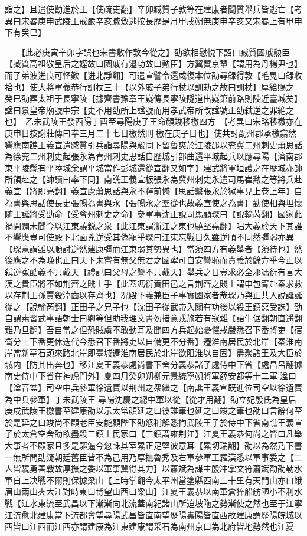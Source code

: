 詣之】且遣使勸進於王【使疏吏翻】辛卯臧質子敦等在建康者聞質舉兵皆逃亡【考異曰宋畧庚申武陵王戒嚴辛亥臧敷逃按長歷是月甲戌朔無庚申辛亥又宋畧上有甲申下有癸巳】

　　【此必庚寅辛卯字誤也宋書敷作敦今從之】劭欲相慰悦下詔曰臧質國戚勲臣【臧質高祖敬皇后之姪故曰國戚有邉功故曰勲臣】方翼贊京輦【謂用為丹楊尹也】而子弟波迸良可怪歎【迸北諍翻】可遣宣譬令還咸復本位劭尋録得敦【毛晃曰録收拾也】使大將軍義恭行訓杖三十【以外戚子弟行杖以訓勅之故曰訓杖】厚給賜之　癸巳劭葬太祖于長寧陵【據齊書豫章王嶷傳長寧陵隧道出嶷第前路則陵近臺城矣】諡曰景皇帝廟號中宗【史不用劭所上諡號而用孝武帝所改諡號正劭弑逆之罪絶之也】　乙未武陵王發西陽丁酉至尋陽庚子王命顔竣移檄四方　【考異曰宋略移檄亦在庚申日按謝莊傳曰奉三月二十七日檄然則檄在庚子日也】使共討劭州郡承檄翕然響應南譙王義宣遣臧質引兵詣尋陽與駿同下留魯爽於江陵邵以兖冀二州刺史蕭思話為徐兖二州刺史起張永為青州刺史思話自歷城引部曲還平城起兵以應尋陽【濟南郡東平陵縣有平陸城余謂平城當作彭城還從宣翻又如字】建武將軍垣護之在歷城亦帥所領赴之【帥讀曰率下同】南譙王義宣板張永為冀州刺史永遣司馬崔勲之等將兵赴義宣【將即亮翻】義宣慮蕭思話與永不釋前憾【思話繫張永於獄事見上卷上年】自為書與思話使長史張暢為書與永【張暢永之羣從也故義宣使之為書】勸使相與坦懷随王誕將受劭命【受會州刺史之命】參軍事沈正說司馬顧琛曰【說輸芮翻】國家此禍開闢未聞今以江東驍鋭之衆【此江東謂浙江之東也驍堅堯翻】唱大義於天下其誰不響應豈可使殿下北面兇逆受其偽寵乎琛曰江東忘戰日久雖逆順不同然彊弱亦異【琛意謂雖以順討逆然建康彊而江東弱其勢異也】當須四方有義舉者【須待也】然後應之不為晚也正曰天下未嘗有無父無君之國寧可自安讐恥而責義於餘方乎今正以弑逆寃酷義不共戴天【禮記曰父母之讐不共戴天】舉兵之日豈求必全邪馮衍有言大漢之貴臣將不如荆齊之賤士乎【此蓋馮衍責田邑之言荆齊之賤士謂申包胥赴秦求救以存荆王孫賈殺淖齒以存齊也】况殿下義兼臣子事實國家者哉琛乃與正共入說誕誕從之【說輸芮翻】正田子之兄子也【沈田子從武帝入關有功後以殺王鎮惡受誅】劭自謂素習武事語朝士曰卿等但助我理文書勿措意戎旅若有寇難【語牛倨翻朝直遥翻難乃旦翻】吾自當之但恐賊虜不敢動耳及聞四方兵起始憂懼戒嚴悉召下番將吏【宿衛分上下番更休迭代今悉召下番將吏以自備更不分番】遷淮南居民於北岸【秦淮南岸當新亭石頭來路北岸即臺城遷淮南居民於北岸欲阻淮以自固】盡聚諸王及大臣於城内【防其出奔也】移江夏王義恭處尚書下舍分義恭諸子處侍中下省【處昌呂翻據南史侍中下省在神虎門外】夏四月癸卯朔柳元景統寧朔將軍薛安都等十二軍湓口【湓音盆】司空中兵參軍徐遺寶以荆州之衆繼之【南譙王義宣既進位司空以徐遺寶為中兵參軍】丁未武陵王尋陽沈慶之總中軍以從【從才用翻】劭立妃殷氏為皇后庚戍武陵王檄書至建康劭以示太常顔延之曰彼誰筆也延之曰竣之筆也劭曰言辭何至於是延之曰竣尚不顧老臣安能顧陛下劭怒稍解悉拘武陵王子於侍中下省南譙王義宣子於太倉空舍劭欲盡殺三鎮士民家口【三鎮謂雍荆江】江夏王義恭何尚之皆曰凡舉大事者不顧家且多是驅逼今忽誅其室累正足堅彼意耳【累切瑞翻】劭以為然乃下書一無所問劭疑朝廷舊臣皆不為己用乃厚撫魯秀及右軍參軍王羅漢悉以軍事委之【二人皆驍勇善戰故厚撫之委以軍事冀得其力】以蕭斌為謀主殷冲掌文符蕭斌勸劭勒水軍自上决戰不爾則保據梁山【上時掌翻今太平州當塗縣西南三十里有天門山亦曰蛾眉山兩山夾大江對峙東曰博望山西曰梁山】江夏王義恭以南軍倉猝船舫陋小不利水戰【江水東流至武昌以下漸漸向北流蓋南紀諸山所迫坡陁之勢漸使之然也至于江寧江流愈北建康當下流都會望尋陽武昌皆直南望歷陽夀陽皆直西故建康謂歷陽皖城以西皆曰江西而江西亦謂建康為江東建康謂采石為南州京口為北府皆地勢然也江夏